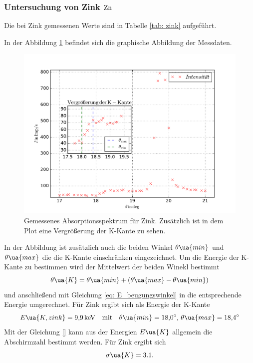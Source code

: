 \subsubsection{Untersuchung von Zink $\ce{Zn}$}\label{sec: zink}
Die bei Zink gemessenen Werte sind in Tabelle \ref{tab: zink} aufgeführt.

In der Abbildung \ref{fig: absotp_zink} befindet sich die graphische Abbildung der Messdaten.
\begin{figure}
  \centering
  \includegraphics[width=1\textwidth]{../Messdaten/zink.pdf}
  \caption{Gemessenes Absorptionsspektrum für Zink. Zusätzlich ist in dem Plot eine Vergrößerung der K-Kante zu sehen.} %
  \label{fig: absotp_zink}
\end{figure}
In der Abbildung ist zusätzlich auch die beiden Winkel $\theta\ua{min}$ und $\theta\ua{max}$ die die K-Kante einschränken
eingezeichnet. Um die Energie der K-Kante zu bestimmen wird der Mittelwert der beiden Winekl bestimmt
\begin{equation}
  \label{eq:theta_k}
  \theta\ua{K}=\theta\ua{min}+\left(\theta\ua{max}-\theta\ua{min}\right)
\end{equation}
und anschließend mit Gleichung \eqref{eq: E_beugungswinkel} in die entsprechende Energie umgerechnet.
Für Zink ergibt sich als Energie der K-Kante
\begin{equation*}
  E\ua{K,zink}=\SI{9.9}{\kilo\eV} \quad \text{mit}\quad \theta\ua{min}=\SI{18.0}{\degree},\,\theta\ua{max}=\SI{18.4}{\degree}
\end{equation*}
Mit der Gleichung \eqref{} kann aus der Energien $E\ua{K}$ allgemein die Abschirmzahl
bestimmt werden.
Für Zink ergibt sich
\begin{equation}
  \label{eq: abschirm_zink}
  \sigma\ua{K}=3.1.
\end{equation}
